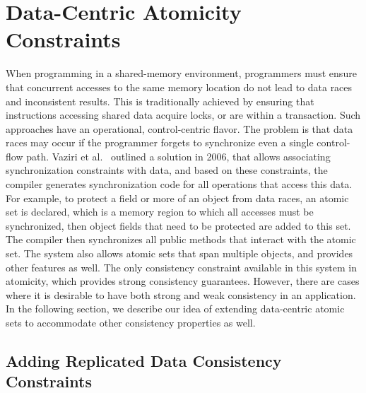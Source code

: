 \documentclass[]{usiinfprospectus}
\begin{document}
\section{Data-Centric Atomicity Constraints}

When programming in a shared-memory environment, programmers must ensure that concurrent accesses to the same memory location do not lead to data races and inconsistent results. This is traditionally achieved by ensuring that instructions accessing shared data acquire locks, or are within a transaction. Such approaches have an operational, control-centric flavor. The problem is that data races may occur if the programmer forgets to synchronize even a single control-flow path. Vaziri et al.~\cite{Vaziri:2006:ASC:1111320.1111067} outlined a solution in 2006, that allows associating synchronization constraints with data, and based on these constraints, the compiler generates synchronization code for all operations that access this data. For example, to protect a field or more of an object from data races, an atomic set is declared, which is a memory region to which all accesses must be synchronized, then object fields that need to be protected are added to this set. The compiler then synchronizes all public methods that interact with the atomic set. The system also allows atomic sets that span multiple objects, and provides other features as well.
The only consistency constraint available in this system in atomicity, which provides strong consistency guarantees. However, there are cases where it is desirable to have both strong and weak consistency in an application. In the following section, we describe our idea of extending data-centric atomic sets to accommodate other consistency properties as well. 

\subsection{Adding Replicated Data Consistency Constraints}
\end{document}
